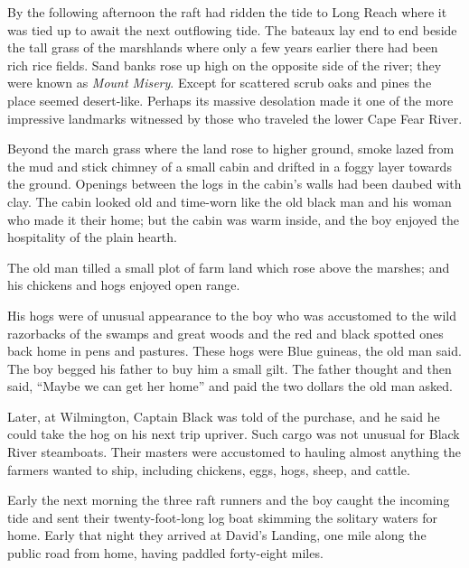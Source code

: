 \documentclass[11pt, a5paper, openright]{book}
\begin{document}
By the following afternoon the raft had ridden the tide to Long Reach
where it was tied up to await the next outflowing tide.  The bateaux
lay end to end beside the tall grass of the marshlands where only a
few years earlier there had been rich rice fields.  Sand banks rose up
high on the opposite side of the river; they were known as
\textit{Mount Misery}.  Except for scattered scrub oaks and pines the
place seemed desert-like.  Perhaps its massive desolation made it one
of the more impressive landmarks witnessed by those who traveled the
lower Cape Fear River.\par

Beyond the march grass where the land rose to higher ground, smoke
lazed from the mud and stick chimney of a small cabin and drifted in a
foggy layer towards the ground.  Openings between the logs in the
cabin's walls had been daubed with clay.  The cabin looked old and
time-worn like the old black man and his woman who made it their home;
but the cabin was warm inside, and the boy enjoyed the hospitality of
the plain hearth.\par

The old man tilled a small plot of farm land which rose above the
marshes; and his chickens and hogs enjoyed open range.\par

His hogs were of unusual appearance to the boy who was accustomed to
the wild razorbacks of the swamps and great woods and the red and
black spotted ones back home in pens and pastures.  These hogs were
Blue guineas, the old man said.  The boy begged his father to buy him
a small gilt.  The father thought and then said, ``Maybe we can get
her home'' and paid the two dollars the old man asked.\par

Later, at Wilmington, Captain Black was
told of the purchase, and he said he could take the hog on his next
trip upriver.  Such cargo was not unusual for Black River steamboats.
Their masters were accustomed to hauling almost anything the farmers
wanted to ship, including chickens, eggs, hogs, sheep, and cattle.\par

Early the next morning the three raft runners and the boy caught the
incoming tide and sent their twenty-foot-long log boat skimming the
solitary waters for home.  Early that night they arrived at David's
Landing, one mile along the public road from home, having paddled
forty-eight miles.\par
\end{document}
